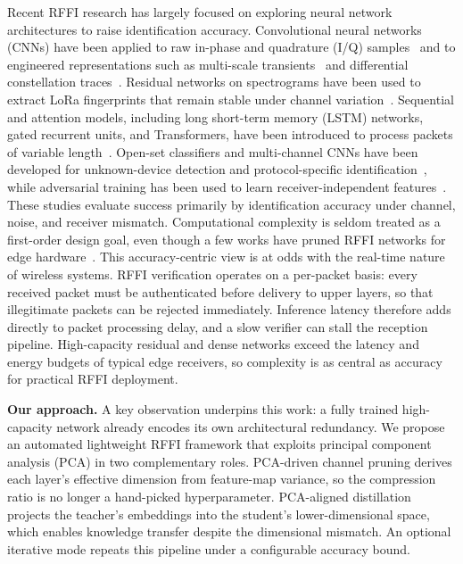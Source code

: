 \documentclass[journal,comsoc]{IEEEtran}
\begin{document}
Recent RFFI research has largely focused on exploring neural network architectures to raise identification accuracy.
Convolutional neural networks (CNNs) have been applied to raw in-phase and quadrature (I/Q) samples~\cite{merchant2018deep,sankhe2020no} and to engineered representations such as multi-scale transients~\cite{yu2019robust} and differential constellation traces~\cite{peng2020deep}.
Residual networks on spectrograms have been used to extract LoRa fingerprints that remain stable under channel variation~\cite{9715147}.
Sequential and attention models, including long short-term memory (LSTM) networks, gated recurrent units, and Transformers, have been introduced to process packets of variable length~\cite{shen2023toward}.
Open-set classifiers and multi-channel CNNs have been developed for unknown-device detection and protocol-specific identification~\cite{hanna2021open,yin2024multichannel}, while adversarial training has been used to learn receiver-independent features~\cite{shen2024towards}.
These studies evaluate success primarily by identification accuracy under channel, noise, and receiver mismatch.
Computational complexity is seldom treated as a first-order design goal, even though a few works have pruned RFFI networks for edge hardware~\cite{jian2022radio}.
This accuracy-centric view is at odds with the real-time nature of wireless systems.
RFFI verification operates on a per-packet basis: every received packet must be authenticated before delivery to upper layers, so that illegitimate packets can be rejected immediately.
Inference latency therefore adds directly to packet processing delay, and a slow verifier can stall the reception pipeline.
High-capacity residual and dense networks exceed the latency and energy budgets of typical edge receivers, so complexity is as central as accuracy for practical RFFI deployment.

\textbf{Our approach.}
A key observation underpins this work: a fully trained high-capacity network already encodes its own architectural redundancy.
We propose an automated lightweight RFFI framework that exploits principal component analysis (PCA) in two complementary roles.
PCA-driven channel pruning derives each layer's effective dimension from feature-map variance, so the compression ratio is no longer a hand-picked hyperparameter.
PCA-aligned distillation projects the teacher's embeddings into the student's lower-dimensional space, which enables knowledge transfer despite the dimensional mismatch.
An optional iterative mode repeats this pipeline under a configurable accuracy bound.
\end{document}
